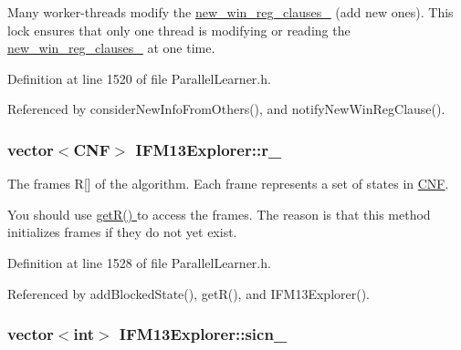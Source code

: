 Many worker-\/threads modify the \hyperlink{classIFM13Explorer_a712b3dc6c099b1e3697e7b8877e0cd90}{new\-\_\-win\-\_\-reg\-\_\-clauses\-\_\-} (add new ones). This lock ensures that only one thread is modifying or reading the \hyperlink{classIFM13Explorer_a712b3dc6c099b1e3697e7b8877e0cd90}{new\-\_\-win\-\_\-reg\-\_\-clauses\-\_\-} at one time. 

Definition at line 1520 of file Parallel\-Learner.\-h.



Referenced by consider\-New\-Info\-From\-Others(), and notify\-New\-Win\-Reg\-Clause().

\hypertarget{classIFM13Explorer_a559dde7f5e4e528ea495c1f4a4d1d072}{
\subsubsection[{r\-\_\-}]{\setlength{\rightskip}{0pt plus 5cm}vector$<${\bf C\-N\-F}$>$ I\-F\-M13\-Explorer\-::r\-\_\-\hspace{0.3cm}{\ttfamily [protected]}}}\label{classIFM13Explorer_a559dde7f5e4e528ea495c1f4a4d1d072}


The frames R\mbox{[}\mbox{]} of the algorithm. Each frame represents a set of states in \hyperlink{classCNF}{C\-N\-F}. 

You should use \hyperlink{classIFM13Explorer_a75a0b20fe6d76b6d1fa52d447fa24d10}{get\-R() } to access the frames. The reason is that this method initializes frames if they do not yet exist. 

Definition at line 1528 of file Parallel\-Learner.\-h.



Referenced by add\-Blocked\-State(), get\-R(), and I\-F\-M13\-Explorer().

\hypertarget{classIFM13Explorer_ad04fb2b668ee928c9c38c61ec1e168ef}{
\subsubsection[{sicn\-\_\-}]{\setlength{\rightskip}{0pt plus 5cm}vector$<$int$>$ I\-F\-M13\-Explorer\-::sicn\-\_\-\hspace{0.3cm}{\ttfamily [protected]}}}\label{classIFM13Explorer_ad04fb2b668ee928c9c38c61ec1e168ef}


